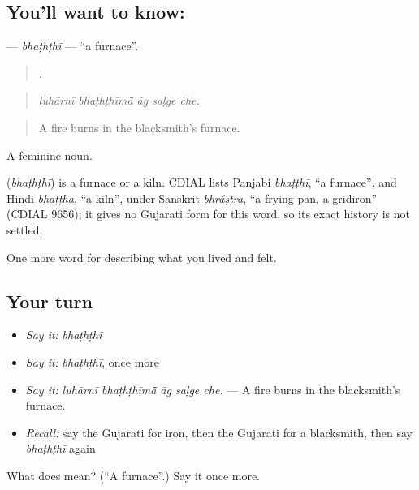 \subsection*{You'll want to know: }
\textbf{} — \emph{bhaṭhṭhī} — \textquotedblleft{}a furnace\textquotedblright{}.

\begin{quote}
    .
\end{quote}

\begin{quote}
\emph{luhārnī bhaṭhṭhīmā̃ āg saḷge che.}
\end{quote}

\begin{quote}
A fire burns in the blacksmith's furnace.
\end{quote}

A feminine noun.

\begin{cousinweb}
\textbf{} (\emph{bhaṭhṭhī}) is a furnace or a kiln. CDIAL lists Panjabi \emph{bhaṭṭhī}, \textquotedblleft{}a furnace\textquotedblright{}, and Hindi \emph{bhaṭṭhā}, \textquotedblleft{}a kiln\textquotedblright{}, under Sanskrit \emph{bhráṣṭra}, \textquotedblleft{}a frying pan, a gridiron\textquotedblright{} (CDIAL 9656); it gives no Gujarati form for this word, so its exact history is not settled.
\end{cousinweb}

\begin{grammarlens}[title={What you've built}]
One more word for describing what you lived and felt.
\end{grammarlens}

\subsection*{Your turn}
\begin{itemize}
\raggedright
  \item \emph{Say it:} \emph{bhaṭhṭhī}
  \item \emph{Say it:} \emph{bhaṭhṭhī}, once more
  \item \emph{Say it:} \emph{luhārnī bhaṭhṭhīmā̃ āg saḷge che.} — A fire burns in the blacksmith's furnace.
  \item \emph{Recall:} say the Gujarati for iron, then the Gujarati for a blacksmith, then say \emph{bhaṭhṭhī} again
\end{itemize}

\begin{tcolorbox}[breakable,colback=teal!4,colframe=teal!35!black,title={Before you move on}]
What does  mean? (\textquotedblleft{}A furnace\textquotedblright{}.) Say it once more.
\end{tcolorbox}
